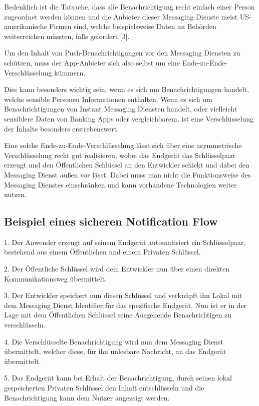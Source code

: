 \documentclass[sigconf]{acmart}
\begin{document}
Bedenklich ist die Tatsache, dass alle Benachrichtigung recht einfach 
einer Person zugeordnet werden können und die Anbieter dieser Messaging 
Dienste meist US-amerikanische Firmen sind, welche beispielsweise 
Daten an Behörden weiterreichen müssten, falls gefordert [3].

Um den Inhalt von Push-Benachrichtigungen vor den Messaging Diensten 
zu schützen, muss der App-Anbieter sich also selbst um eine 
Ende-zu-Ende-Verschlüsselung kümmern.

Dies kann besonders wichtig sein, wenn es sich um Benachrichtigungen 
handelt, welche sensible Personen Informationen enthalten. Wenn es 
sich um Benachrichtigungen von Instant Messaging Diensten handelt, 
oder vielleicht sensiblere Daten von Banking Apps oder vergleichbarem, 
ist eine Verschlüsselung der Inhalte besonders erstrebenswert.

Eine solche Ende-zu-Ende-Verschlüsselung lässt sich über eine 
asymmetrische Verschlüsselung recht gut realisieren, wobei das 
Endgerät das Schlüsselpaar erzeugt und den Öffentlichen Schlüssel an 
den Entwickler schickt und dabei den Messaging Dienst außen vor lässt. 
Dabei muss man nicht die Funktionsweise des Messaging Dienstes 
einschränken und kann vorhandene Technologien weiter nutzen.



\subsection{Beispiel eines sicheren Notification Flow}

1. Der Anwender erzeugt auf seinem Endgerät automatisiert ein 
Schlüsselpaar, bestehend aus einem Öffentlichen und einem Privaten 
Schlüssel.

2. Der Öffentliche Schlüssel wird dem Entwickler nun über einen direkten 
Kommunikationsweg übermittelt.

3. Der Entwickler speichert nun diesen Schlüssel und verknüpft ihn Lokal 
mit dem Messaging Dienst Identifier für das spezifische Endgerät. 
Nun ist er in der Lage mit dem Öffentlichen Schlüssel seine Ausgehende 
Benachrichtigen zu verschlüsseln.

4. Die Verschlüsselte Benachrichtigung wird nun dem Messaging Dienst 
übermittelt, welcher diese, für ihn unlesbare Nachricht, an das Endgerät 
übermittelt.

5. Das Endgerät kann bei Erhalt der Benachrichtigung, durch seinen lokal 
gespeicherten Privaten Schlüssel den Inhalt entschlüsseln und die 
Benachrichtigung kann dem Nutzer angezeigt werden.
\end{document}
